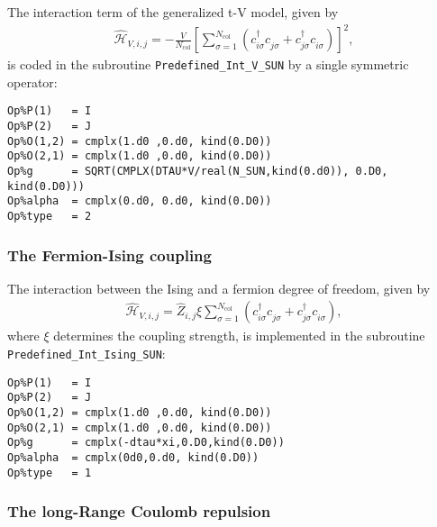 The interaction term of the generalized t-V model, given by 
\begin{align}
\hat{\mathcal{H}}_{V,i,j} =
-\frac{V}{N_\mathrm{col}}\left[ \sum_{\sigma=1}^{N_\mathrm{col}}\left( c^{\dagger}_{i \sigma} c^{\phantom\dagger}_{j \sigma} + c^{\dagger}_{j \sigma} c^{\phantom\dagger}_{i \sigma} \right) \right]^2,
\end{align} 
is coded in the subroutine \texttt{Predefined\_Int\_V\_SUN} by a single symmetric operator:
\begin{lstlisting}[style=fortran]
Op%P(1)   = I
Op%P(2)   = J
Op%O(1,2) = cmplx(1.d0 ,0.d0, kind(0.D0)) 
Op%O(2,1) = cmplx(1.d0 ,0.d0, kind(0.D0))
Op%g      = SQRT(CMPLX(DTAU*V/real(N_SUN,kind(0.d0)), 0.D0, kind(0.D0))) 
Op%alpha  = cmplx(0.d0, 0.d0, kind(0.D0))
Op%type   = 2

\end{lstlisting}


\subsubsection{The Fermion-Ising coupling}

The interaction between the Ising and a fermion degree of freedom, given by
\begin{align}
\hat{\mathcal{H}}_{V,i,j} =
\hat{Z}_{i,j} \xi  \sum_{\sigma=1}^{N_\mathrm{col}}\left( c^{\dagger}_{i \sigma} c^{\phantom\dagger}_{j \sigma} + c^{\dagger}_{j \sigma} c^{\phantom\dagger}_{i \sigma} \right),
\end{align} 
where $\xi$ determines the coupling strength, is implemented in the subroutine \texttt{Predefined\_Int\_Ising\_SUN}:
\begin{lstlisting}[style=fortran]
Op%P(1)   = I
Op%P(2)   = J
Op%O(1,2) = cmplx(1.d0 ,0.d0, kind(0.D0)) 
Op%O(2,1) = cmplx(1.d0 ,0.d0, kind(0.D0)) 
Op%g      = cmplx(-dtau*xi,0.D0,kind(0.D0))
Op%alpha  = cmplx(0d0,0.d0, kind(0.D0)) 
Op%type   = 1

\end{lstlisting}



\subsubsection{The long-Range Coulomb repulsion}

